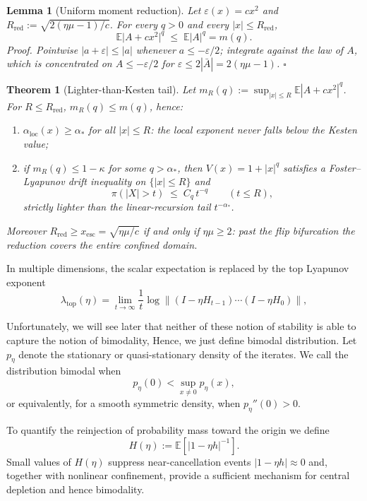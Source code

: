 \documentclass{article} %
\theoremstyle{plain}
\newtheorem{theorem}{Theorem}
\newtheorem{lemma}{Lemma}
\theoremstyle{definition}
\newcommand{\E}{\mathbb{E}}
\newcommand{\norm}[1]{\left\lVert #1\right\rVert}
\begin{document}
\begin{itemize}[nosep,leftmargin=*]
\begin{lemma}[Uniform moment reduction]
Let $\varepsilon(x)=cx^2$ and $R_{\mathrm{red}}:=\sqrt{2(\eta\mu-1)/c}$.
For every $q>0$ and every $|x|\le R_{\mathrm{red}}$,
\[
\mathbb E\bigl|A+cx^2\bigr|^{q}\;\le\;\mathbb E|A|^{q}=m(q).
\]
\emph{Proof.} Pointwise $|a+\varepsilon|\le|a|$ whenever $a\le-\varepsilon/2$;
integrate against the law of $A$, which is concentrated on
$A\le -\varepsilon/2$ for $\varepsilon\le 2|\bar A|=2(\eta\mu-1)$. $\square$
\end{lemma}

\begin{theorem}[Lighter-than-Kesten tail]
Let $m_R(q):=\sup_{|x|\le R}\mathbb E|A+cx^2|^q$. For $R\le R_{\mathrm{red}}$,
$m_R(q)\le m(q)$, hence:
\begin{enumerate}
\item $\alpha_{\mathrm{loc}}(x)\ge\alpha_*$ for all $|x|\le R$: the local
exponent never falls below the Kesten value;
\item if $m_R(q)\le 1-\kappa$ for some $q>\alpha_*$, then $V(x)=1+|x|^q$
satisfies a Foster--Lyapunov drift inequality on $\{|x|\le R\}$ and
\[
\pi(|X|>t)\;\le\;C_q\,t^{-q}\qquad (t\le R),
\]
strictly lighter than the linear-recursion tail $t^{-\alpha_*}$.
\end{enumerate}
Moreover $R_{\mathrm{red}}\ge x_{\mathrm{esc}}=\sqrt{\eta\mu/c}$ if and only
if $\eta\mu\ge2$: past the flip bifurcation the reduction covers the entire
confined domain.
\end{theorem}


In multiple dimensions, the scalar expectation is replaced by the top Lyapunov exponent
\begin{equation}
 \lambda_{\mathrm{top}}(\eta)
 =\lim_{t\to\infty}\frac1t
 \log\norm{(I -\eta H_{t-1})\cdots(I-\eta H_0)},
 \label{eq:toplyap}
\end{equation}

Unfortunately, we will see later that neither of these notion of stability is able to capture the notion of bimodality, Hence, we just define bimodal distribution. 
Let $p_\eta$ denote the stationary or quasi-stationary density of the iterates. We call the distribution bimodal when
\begin{equation}
    p_\eta(0)<\sup_{x\neq 0}p_\eta(x),
\end{equation}
or equivalently, for a smooth symmetric density, when $p_\eta''(0)>0$.

To quantify the reinjection of probability mass toward the origin we define
\begin{equation}
    H(\eta):=\E\!\left[|1-\eta h|^{-1}\right].
\end{equation}
Small values of $H(\eta)$ suppress near-cancellation events $|1-\eta h|\approx 0$ and, together with nonlinear confinement, provide a sufficient mechanism for central depletion and hence bimodality.


\end{itemize}
\end{document}
